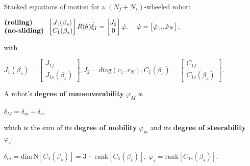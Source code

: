 \documentclass[landscape]{article}
\newcommand{\vmspace}{\vspace{-7pt}}
\newcommand{\vpspace}{\vspace{5pt}}
\begin{document}
\begin{multicols}{3}
\vpspace

\begin{minipage}{\columnwidth}
  Stacked equations of motion for a $(N_f+N_s)$-wheeled robot:
  \vmspace
  \begin{center}
    $\begin{matrix}
      \text{\textbf{(rolling)}}\;\;\;\;\;\; \\
      \text{\textbf{(no-sliding)}}
    \end{matrix}\;\;
    \left[\begin{matrix}
      J_1(\beta_s) \\
      C_1(\beta_s)
    \end{matrix}\right]
    R(\theta)\dot\xi_I
    =
    \left[\begin{matrix}
      J_2 \\
      0
    \end{matrix}\right]
    \dot\varphi,\;\;\;\;
    \dot\varphi
    =
    \left[\begin{matrix}
      \dot\varphi_1..\dot\varphi_N
    \end{matrix}\right],$
  \end{center}
\end{minipage}

\begin{minipage}{\columnwidth}
  with
  \vmspace
  \begin{center}
    $J_1(\beta_s)
    =
    \left[\begin{matrix}
      J_{1f} \\
      J_{1s}(\beta_s)
    \end{matrix}\right],
    J_2
    =
    \mathrm{diag}(r_1..r_N),
    C_1(\beta_s)
    =
    \left[\begin{matrix}
      C_{1f} \\
      C_{1s}(\beta_s)
    \end{matrix}\right].$
  \end{center}
\end{minipage}

\vpspace

\begin{minipage}{\columnwidth}
  A robot's \textbf{degree of maneuverability} $\varphi_M$ is
  \vmspace
  \begin{center}
    $\delta_M = \delta_m + \delta_s$,
  \end{center}
  \vmspace
  which is the sum of its \textbf{degree of mobility} $\varphi_m$ and its
  \textbf{degree of steerability} $\varphi_s$:
  \vmspace
  \begin{center}
    $\delta_m=\mathrm{dim}\,\mathrm{N}\left[C_1(\beta_s)\right] = 3 -
    \mathrm{rank}\left[C_1(\beta_s)\right],\;
    \varphi_s = \mathrm{rank}\left[C_{1s}(\beta_s)\right].$
  \end{center}
\end{minipage}


\end{multicols}
\end{document}
